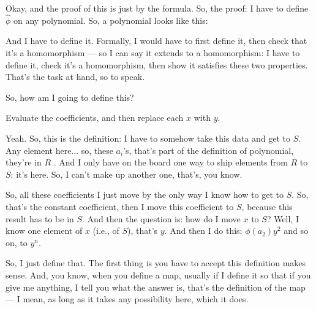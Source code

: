 \begin{proofWrapper}

\begin{speech}[00:09:00 - 00:09:48]
Okay, and the proof of this is just by the formula. So, the proof:  I have to define $\hat{\phi}$ on any polynomial. So, a polynomial looks like this: 

And I have to define it. Formally, I would have to first define it, then check that it's a homomorphism --- so I can say it extends to a homomorphism: I have to define it, check it's a homomorphism, then show it satisfies these two properties. That's the task at hand, so to speak.

So, how am I going to define this?
\end{speech}

\begin{student}
Evaluate the coefficients, and then replace each $x$ with $y$.
\end{student}

\begin{speech}[00:09:53 - 00:10:45]
Yeah. So, this is the definition: I have to somehow take this data and get to $S$. Any element here... so, these $a_i$'s, that's part of the definition of polynomial, they're in $R$ . And I only have on the board one way to ship elements from $R$ to $S$: it's here. So, I can't make up another one, that's, you know.

So, all these coefficients I just move by the only way I know how to get to $S$. So, that's the constant coefficient, then I move this coefficient to $S$, because this result has to be in $S$. And then the question is: how do I move $x$ to $S$? Well, I know one element of $x$ (i.e., of $S$), that's $y$. And then I do this: $\phi(a_2) y^2$ and so on, to $y^n$. 
\end{speech}

\begin{speech}[00:10:45 - 00:12:20]
So, I just define that. The first thing is you have to accept this definition makes sense. And, you know, when you define a map, usually if I define it so that if you give me anything, I tell you what the answer is, that's the definition of the map --- I mean, as long as it takes any possibility here, which it does.


\end{speech}
\end{proofWrapper}
